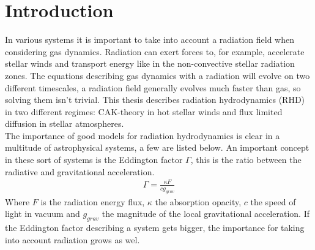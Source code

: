 \chapter{Introduction}

In various systems it is important to take into account a radiation field when considering gas dynamics. Radiation can exert forces to, for example, accelerate stellar winds and transport energy like in the non-convective stellar radiation zones. The equations describing gas dynamics with a radiation will evolve on two different timescales, a radiation field generally evolves much faster than gas, so solving them isn't trivial. This thesis describes radiation hydrodynamics (RHD) in two different regimes: CAK-theory in hot stellar winds and flux limited diffusion in stellar atmospheres.\\

The importance of good models for radiation hydrodynamics is clear in a multitude of astrophysical systems, a few are listed below. An important concept in these sort of systems is the Eddington factor $\Gamma$, this is the ratio between the radiative and gravitational acceleration.
\begin{align}
	\Gamma = \frac{\kappa F}{c g_{grav}}
\end{align}
Where $F$ is the radiation energy flux, $\kappa$ the absorption opacity, $c$ the speed of light in vacuum and $g_{grav}$ the magnitude of the local gravitational acceleration. If the Eddington factor describing a system gets bigger, the importance for taking into account radiation grows as wel.

